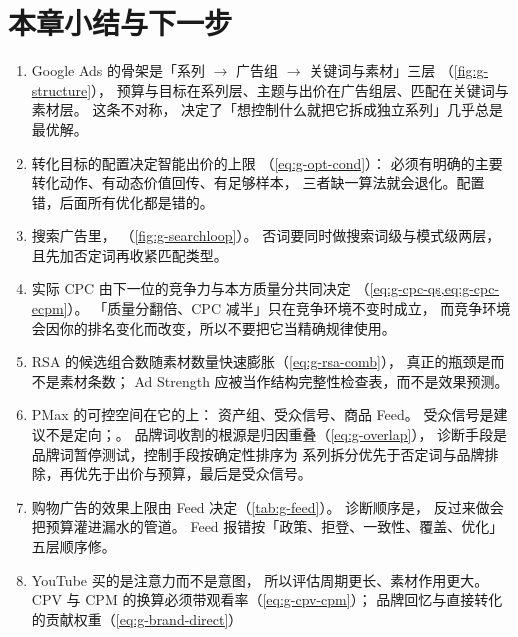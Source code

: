 \section{本章小结与下一步}

\begin{keypoint}[本章要点回顾]
\begin{enumerate}
  \item Google Ads 的骨架是「系列 $\to$ 广告组 $\to$ 关键词与素材」三层
        （\cref{fig:g-structure}），
        预算与目标在系列层、主题与出价在广告组层、匹配在关键词与素材层。
        这条不对称，
        决定了「想控制什么就把它拆成独立系列」几乎总是最优解。
  \item 转化目标的配置决定智能出价的上限
        （\cref{eq:g-opt-cond}）：
        必须有明确的主要转化动作、有动态价值回传、有足够样本，
        三者缺一算法就会退化。配置错，后面所有优化都是错的。
  \item 搜索广告里，
        （\cref{fig:g-searchloop}）。
        否词要同时做搜索词级与模式级两层，且先加否定词再收紧匹配类型。
  \item 实际 CPC 由下一位的竞争力与本方质量分共同决定
        （\cref{eq:g-cpc-qs,eq:g-cpc-ecpm}）。
        「质量分翻倍、CPC 减半」只在竞争环境不变时成立，
        而竞争环境会因你的排名变化而改变，所以不要把它当精确规律使用。
  \item RSA 的候选组合数随素材数量快速膨胀（\cref{eq:g-rsa-comb}），
        真正的瓶颈是而不是素材条数；
        Ad Strength 应被当作结构完整性检查表，而不是效果预测。
  \item PMax 的可控空间在它的上：
        资产组、受众信号、商品 Feed。
        受众信号是建议不是定向；。
        品牌词收割的根源是归因重叠（\cref{eq:g-overlap}），
        诊断手段是品牌词暂停测试，控制手段按确定性排序为
        系列拆分优先于否定词与品牌排除，再优先于出价与预算，最后是受众信号。
  \item 购物广告的效果上限由 Feed 决定（\cref{tab:g-feed}）。
        诊断顺序是，
        反过来做会把预算灌进漏水的管道。
        Feed 报错按「政策、拒登、一致性、覆盖、优化」五层顺序修。
  \item YouTube 买的是注意力而不是意图，
        所以评估周期更长、素材作用更大。
        CPV 与 CPM 的换算必须带观看率（\cref{eq:g-cpv-cpm}）；
        品牌回忆与直接转化的贡献权重（\cref{eq:g-brand-direct}）

\end{enumerate}
\end{keypoint}
